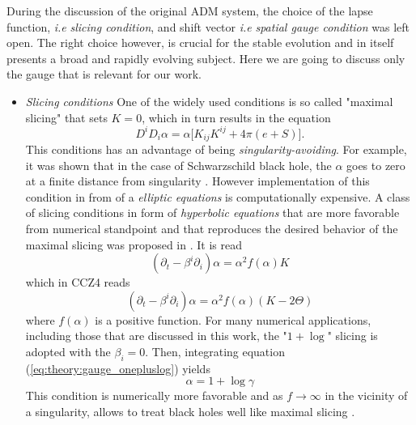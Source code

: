 {    
    During the discussion of the original ADM system, the choice of the lapse function, \textit{i.e} \textit{slicing condition}, and shift vector \textit{i.e} \textit{spatial gauge condition} was left open. 
    The right choice however, is crucial for the stable evolution and in itself presents a broad and rapidly evolving subject. Here we are going to discuss only the gauge that is relevant for our work. 
    
    \begin{itemize}
        \item \textit{Slicing conditions} 
        One of the widely used conditions is so called "maximal slicing" that sets $K=0$, which in turn results in the equation
        \begin{equation}
            D^{i}D_{i}\alpha = \alpha\big[K_{ij}K^{ij} + 4\pi(e+S)\big].
        \end{equation}
        This conditions has an advantage of being \textit{singularity-avoiding}. 
        For example, it was shown that in the case of Schwarzschild black hole, the $\alpha$ goes to zero at a finite distance from singularity \cite{Geyer:1995}. 
        However implementation of this condition in from of a \textit{elliptic equations} is computationally expensive.
        A class of slicing conditions in form of \textit{hyperbolic equations} that are more favorable from numerical standpoint and that reproduces the desired behavior of the maximal slicing was proposed in \cite{Bona:1994dr}. It is read 
        \begin{equation}
            (\partial_t - \beta^i\partial_i)\alpha = \alpha^2 f(\alpha)K
        \label{eq:theory:gauge_onepluslog}
        \end{equation}
        which in CCZ4 reads 
        \begin{equation}
            (\partial_t - \beta^i \partial_i )\alpha = \alpha^2 f(\alpha)(K-2\Theta)
        \end{equation}
        where $f(\alpha)$ is a positive function. 
        For many numerical applications, including those that are discussed in this work, the "$1 + \log$" slicing is adopted with the $\beta_i=0$. 
        Then, integrating equation (\ref{eq:theory:gauge_onepluslog}) yields 
        \begin{equation}
            \alpha = 1 + \log\gamma
        \end{equation}
        This condition is numerically more favorable and as $f\rightarrow\infty$ in the vicinity of a singularity, allows to treat black holes well like maximal slicing \cite{Baumgarte:2002jm}.
        

\end{itemize}}

